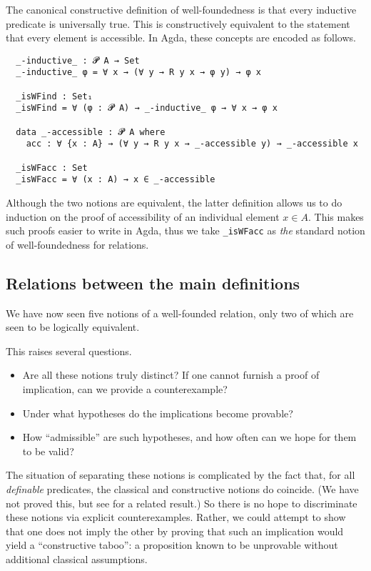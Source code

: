 The canonical constructive definition of well-foundedness is that
every inductive predicate is universally true.
This is constructively equivalent to the statement that every element
is accessible.  In Agda, these concepts are encoded as follows.
{\small
\begin{verbatim}
  _-inductive_ : 𝓟 A → Set
  _-inductive_ φ = ∀ x → (∀ y → R y x → φ y) → φ x

  _isWFind : Set₁
  _isWFind = ∀ (φ : 𝓟 A) → _-inductive_ φ → ∀ x → φ x

  data _-accessible : 𝓟 A where
    acc : ∀ {x : A} → (∀ y → R y x → _-accessible y) → _-accessible x

  _isWFacc : Set
  _isWFacc = ∀ (x : A) → x ∈ _-accessible
\end{verbatim}
}
Although the two notions are equivalent, the latter definition allows us to do induction on the proof of accessibility of an individual element $x \in A$.  This makes such proofs easier to write in Agda, thus we take
\verb|_isWFacc| as \emph{the} standard notion of well-foundedness for relations.

\subsection{Relations between the main definitions}

We have now seen five notions of a well-founded relation, only two of which
are seen to be logically equivalent.

This raises several questions.
\begin{itemize}
\item Are all these notions truly distinct?  If one cannot furnish a proof of implication,
can we provide a counterexample?
\item Under what hypotheses do the implications become provable?
\item How ``admissible'' are such hypotheses, and how often can we hope for them to be valid?
\end{itemize}

The situation of separating these notions is complicated by the fact that, for all
\emph{definable} predicates, the classical and constructive notions do coincide.
(We have not proved this, but see \cite{Berardi} for a related result.)
So there is no hope to discriminate these notions via explicit counterexamples.
Rather, we could attempt to show that one does not imply the other by proving that
such an implication would yield a ``constructive taboo'': a proposition known to be
unprovable without additional classical assumptions.

